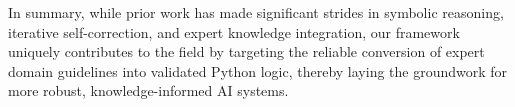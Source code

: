In summary, while prior work has made significant strides in symbolic reasoning, iterative self-correction, and expert knowledge integration, our framework uniquely contributes to the field by targeting the reliable conversion of expert domain guidelines into validated Python logic, thereby laying the groundwork for more robust, knowledge-informed AI systems.








